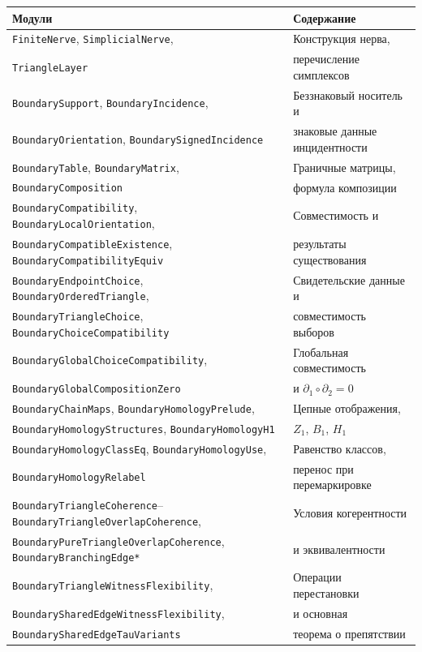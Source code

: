 \documentclass[11pt,a4paper]{article}
\theoremstyle{plain}
\theoremstyle{definition}
\theoremstyle{remark}
\begin{document}
\medskip
\begin{center}
\small
\begin{tabular}{ll}
\toprule
\textbf{Модули} & \textbf{Содержание} \\
\midrule
\texttt{FiniteNerve}, \texttt{SimplicialNerve}, &
  Конструкция нерва, \\
\texttt{TriangleLayer} &
  перечисление симплексов \\[3pt]
\texttt{BoundarySupport},
  \texttt{BoundaryIncidence}, &
  Беззнаковый носитель и \\
\texttt{BoundaryOrientation},
  \texttt{BoundarySignedIncidence} &
  знаковые данные инцидентности \\[3pt]
\texttt{BoundaryTable},
  \texttt{BoundaryMatrix}, &
  Граничные матрицы, \\
\texttt{BoundaryComposition} &
  формула композиции \\[3pt]
\texttt{BoundaryCompatibility},
  \texttt{BoundaryLocalOrientation}, &
  Совместимость и \\
\texttt{BoundaryCompatibleExistence},
  \texttt{BoundaryCompatibilityEquiv} &
  результаты существования \\[3pt]
\texttt{BoundaryEndpointChoice},
  \texttt{BoundaryOrderedTriangle}, &
  Свидетельские данные и \\
\texttt{BoundaryTriangleChoice},
  \texttt{BoundaryChoiceCompatibility} &
  совместимость выборов \\[3pt]
\texttt{BoundaryGlobalChoiceCompatibility}, &
  Глобальная совместимость \\
\texttt{BoundaryGlobalCompositionZero} &
  и $\partial_1 \circ \partial_2 = 0$ \\[3pt]
\texttt{BoundaryChainMaps},
  \texttt{BoundaryHomologyPrelude}, &
  Цепные отображения, \\
\texttt{BoundaryHomologyStructures},
  \texttt{BoundaryHomologyH1} &
  $Z_1$, $B_1$, $H_1$ \\[3pt]
\texttt{BoundaryHomologyClassEq},
  \texttt{BoundaryHomologyUse}, &
  Равенство классов, \\
\texttt{BoundaryHomologyRelabel} &
  перенос при перемаркировке \\[3pt]
\texttt{BoundaryTriangleCoherence}--
  \texttt{BoundaryTriangleOverlapCoherence}, &
  Условия когерентности \\
\texttt{BoundaryPureTriangleOverlapCoherence},
  \texttt{BoundaryBranchingEdge*} &
  и эквивалентности \\[3pt]
\texttt{BoundaryTriangleWitnessFlexibility}, &
  Операции перестановки \\
\texttt{BoundarySharedEdgeWitnessFlexibility}, &
  и основная \\
\texttt{BoundarySharedEdgeTauVariants} &
  теорема о препятствии \\
\bottomrule
\end{tabular}
\end{center}
\end{document}
